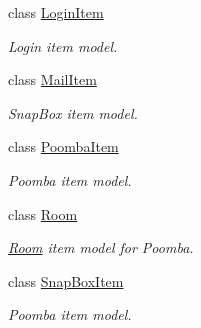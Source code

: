 \begin{DoxyCompactItemize}
class \mbox{\hyperlink{class_f_w_p_s_1_1_models_1_1_login_item}{Login\+Item}}
\begin{DoxyCompactList}\small\item\em Login item model. \end{DoxyCompactList}\item 
class \mbox{\hyperlink{class_f_w_p_s_1_1_models_1_1_mail_item}{Mail\+Item}}
\begin{DoxyCompactList}\small\item\em Snap\+Box item model. \end{DoxyCompactList}\item 
class \mbox{\hyperlink{class_f_w_p_s_1_1_models_1_1_poomba_item}{Poomba\+Item}}
\begin{DoxyCompactList}\small\item\em Poomba item model. \end{DoxyCompactList}\item 
class \mbox{\hyperlink{class_f_w_p_s_1_1_models_1_1_room}{Room}}
\begin{DoxyCompactList}\small\item\em \mbox{\hyperlink{class_f_w_p_s_1_1_models_1_1_room}{Room}} item model for Poomba. \end{DoxyCompactList}\item 
class \mbox{\hyperlink{class_f_w_p_s_1_1_models_1_1_snap_box_item}{Snap\+Box\+Item}}
\begin{DoxyCompactList}\small\item\em Poomba item model. \end{DoxyCompactList}\end{DoxyCompactItemize}
